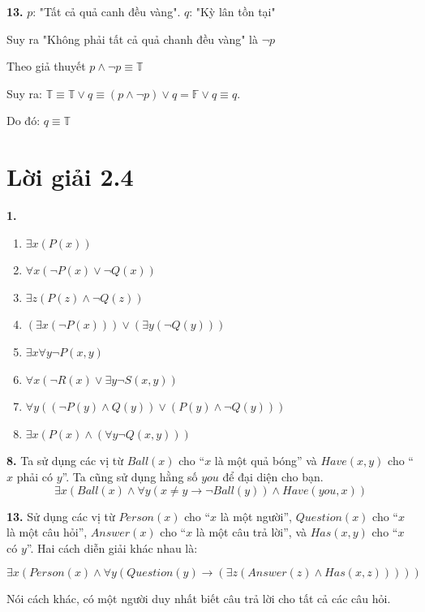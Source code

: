 \documentclass[12pt,a4paper]{article}
\theoremstyle{definition}
\begin{document}
\textbf{13.} $p$: "Tất cả quả canh đều vàng". $q$: "Kỳ lân tồn tại"

Suy ra "Không phải tất cả quả chanh đều vàng" là $\neg p$

Theo giả thuyết $p \land \neg p \equiv \mathbb{T}$

Suy ra: $\mathbb{T} \equiv \mathbb{T} \lor q \equiv (p \land \neg p) \lor q = \mathbb{F} \lor q \equiv q$.

Do đó: $q \equiv \mathbb{T}$

\section*{Lời giải 2.4}

\textbf{1.}
\begin{enumerate}[label=\textbf{\alph*)}]
\item $\exists x(P(x))$
\item $\forall x(\neg P(x) \lor \neg Q(x))$
\item $\exists z(P(z) \land \neg Q(z))$
\item $(\exists x(\neg P(x))) \lor (\exists y(\neg Q(y)))$
\item $\exists x \forall y \neg P(x, y)$
\item $\forall x(\neg R(x) \lor \exists y \neg S(x, y))$
\item $\forall y((\neg P(y) \land Q(y)) \lor (P(y) \land \neg Q(y)))$
\item $\exists x(P(x) \land (\forall y \neg Q(x, y)))$
\end{enumerate}

\medskip
\textbf{8.} Ta sử dụng các vị từ $\textit{Ball}(x)$ cho ``$x$ là một quả bóng'' và $\textit{Have}(x, y)$ cho ``$x$ phải có $y$''. Ta cũng sử dụng hằng số $\textit{you}$ để đại diện cho bạn.
\[\exists x(\textit{Ball}(x) \land \forall y(x \neq y \to \neg \textit{Ball}(y)) \land \textit{Have}(\textit{you}, x))\]

\medskip
\textbf{13.} Sử dụng các vị từ $\textit{Person}(x)$ cho ``$x$ là một người'', $\textit{Question}(x)$ cho ``$x$ là một câu hỏi'', $\textit{Answer}(x)$ cho ``$x$ là một câu trả lời'', và $\textit{Has}(x, y)$ cho ``$x$ có $y$''. Hai cách diễn giải khác nhau là:

\[\exists x(\textit{Person}(x) \land \forall y(\textit{Question}(y) \to (\exists z(\textit{Answer}(z) \land \textit{Has}(x, z)))))\]

Nói cách khác, có một người duy nhất biết câu trả lời cho tất cả các câu hỏi.
\end{document}
